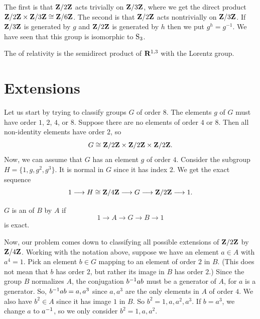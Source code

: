 \documentclass[11pt, oneside]{amsart}
\begin{document}
The first is that $\mathbf Z/2\mathbf Z$ acts trivially on $\mathbf Z/3\mathbf Z$, where we get the direct product \newline$\mathbf Z/2\mathbf Z\times \mathbf Z/3\mathbf Z\cong \mathbf Z/6\mathbf Z$. The second is that $\mathbf Z/2\mathbf Z$ acts nontrivially on $\mathbf Z/3\mathbf Z$. If $\mathbf Z/3\mathbf Z$ is generated by $g$ and $\mathbf Z/2\mathbf Z$ is generated by $h$ then we put $g^h = g^{-1}$. We have seen that this group is isomorphic to $\operatorname{S}_3$.

\begin{example}
The  of relativity is the semidirect product of $\mathbf R^{1,3}$ with the {Lorentz group}.
\end{example}

\section{Extensions}
Let us start by trying to classify groups $G$ of order $8$. The elements $g$ of $G$ must have order $1$, $2$, $4$, or $8$. Suppose there are no elements of order $4$ or $8$. Then all non-identity elements have order $2$, so 
$$
G \cong \mathbf Z/2\mathbf Z \times \mathbf Z/2\mathbf Z \times \mathbf Z/2\mathbf Z.
$$ 
Now, we can assume that $G$ has an element $g$ of order $4$. Consider the subgroup $H = \{ 1,g,g^2, g^3\}$. It is normal in $G$ since it has index $2$. We get the exact sequence
$$
1\longrightarrow H\cong \mathbf Z/4\mathbf Z \longrightarrow G\longrightarrow \mathbf Z/2\mathbf Z \longrightarrow 1.
$$

\begin{definition}
$G$ is an  of $B$ by $A$ if
$$
1\longrightarrow A \longrightarrow G \longrightarrow B \longrightarrow 1
$$
is exact.
\end{definition}

Now, our problem comes down to classifying all possible extensions of $\mathbf Z / 2\mathbf Z$ by $\mathbf Z / 4\mathbf Z$. Working with the notation above, suppose we have an element $a\in A$ with $a^4 =1$. Pick an element $b\in G$ mapping to an element of order $2$ in $B$. (This does not mean that $b$ has order $2$, but rather its image in $B$ has order $2$.) Since the group $B$ {normalizes} $A$, the conjugation $b^{-1} ab $ must be a generator of $A$, for $a$ is a generator. So, $b^{-1} ab =a,a^3$ since $a,a^3$ are the only elements in $A$ of order $4$. We also have $b^2\in A$ since it has image $1$ in $B$. So $b^2=1,a,a^2,a^3$. If $b=a^3$, we change $a$ to $a^{-1}$, so we only consider $b^2 = 1,a,a^2$.
\end{document}
